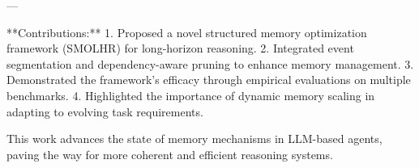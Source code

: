 ---

**Contributions:**  
1. Proposed a novel structured memory optimization framework (SMOLHR) for long-horizon reasoning.  
2. Integrated event segmentation and dependency-aware pruning to enhance memory management.  
3. Demonstrated the framework's efficacy through empirical evaluations on multiple benchmarks.  
4. Highlighted the importance of dynamic memory scaling in adapting to evolving task requirements.  

This work advances the state of memory mechanisms in LLM-based agents, paving the way for more coherent and efficient reasoning systems.  